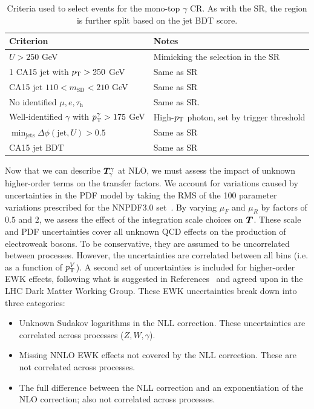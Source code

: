 \begin{table}[]
    \caption{Criteria used to select events for the mono-top $\gamma$ CR. As with the SR, the region is further split based on the jet BDT score.}
    \label{tab:mt:pho_cuts}
    \centering
    \begin{tabular}{p{}p{}}
        Criterion & Notes \\
        \hline
        \hline
        $U>250$ GeV & Mimicking the selection in the SR\\
        1 CA15 jet with $p_\mathrm{T}>250$ GeV &  Same as SR \\
        CA15 jet $110 < m_\mathrm{SD} < 210$ GeV & Same as SR \\
        \hline
        No identified $\mu,e,\tau_\mathrm{h}$ & Same as SR. \\
        Well-identified $\gamma$ with $p_\mathrm{T}^\gamma>175$ GeV & High-$p_\mathrm{T}$ photon, set by trigger threshold \\
        \hline
        $\min_\mathrm{jets}\Delta\phi(\mathrm{jet},U) > 0.5$ & Same as SR \\
        \hline
        CA15 jet BDT & Same as SR\\
    \end{tabular}
\end{table}

Now that we can describe $\bm{T}^{\gamma}_{\gamma}$ at NLO, we must assess the impact of unknown higher-order terms on the transfer factors.
We account for variations caused by uncertainties in the PDF model by taking the RMS of the 100 parameter variations prescribed for the NNPDF3.0 set~\cite{nnpdf}.
By varying $\mu_F$ and $\mu_R$ by factors of $0.5$ and $2$, we assess the effect of the integration scale choices on $\bm{T}^{}_{}$.
These scale and PDF uncertainties cover all unknown QCD effects on the production of electroweak bosons.
To be conservative, they are assumed to be uncorrelated between processes.
However, the uncertainties are correlated between all bins (i.e. as a function of $p_\mathrm{T}^V$).
A second set of uncertainties is included for higher-order EWK effects, following what is suggested in References~\cite{ewk5,ewk4,ewk6,ewk2,ewk3,ewk9,ewk8,ewk1,ewk7} and agreed upon in the LHC Dark Matter Working Group.
These EWK uncertainties break down into three categories:
\begin{itemize}
    \item Unknown Sudakov logarithms in the NLL correction. These uncertainties are correlated across processes ($Z,W,\gamma$).
    \item Missing NNLO EWK effects not covered by the NLL correction. These are not correlated across processes.
    \item The full difference between the NLL correction and an exponentiation of the NLO correction; also not correlated across processes.
\end{itemize}

